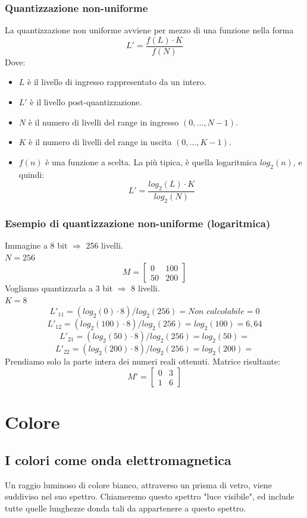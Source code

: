\documentclass{report}
\begin{document}
	\subsection{Quantizzazione non-uniforme}
	La quantizzazione non uniforme avviene per mezzo di una funzione nella forma
	$$
	L' = \frac{f(L) \cdot K}{f(N)}
	$$
	Dove:
	\begin{itemize}
		\item $L$ è il livello di ingresso rappresentato da un intero.
		\item $L'$ è il livello post-quantizzazione.
		\item $N$ è il numero di livelli del range in ingresso $(0, ..., N-1)$.
		\item $K$ è il numero di livelli del range in uscita $(0, ..., K-1)$.
		\item $f(n)$ è una funzione a scelta. La più tipica, è quella logaritmica $log_2(n)$, e quindi:
		      $$
		      L' = \frac{log_2(L) \cdot K}{log_2(N)}
		      $$
	\end{itemize}
	
	
	
	\subsection{Esempio di quantizzazione non-uniforme (logaritmica)}
	Immagine a 8 bit $\Rightarrow$ 256 livelli.\\
	$N = 256$
	$$
	M = 
	\begin{bmatrix}
		0  & 100 \\
		50 & 200 
	\end{bmatrix}
	$$
	Vogliamo quantizzarla a 3 bit $\Rightarrow$ 8 livelli.\\
	$K = 8$
	$$
	L'_{11} = (log_2(0) \cdot 8)/log_2(256) = \textit{Non calcolabile} = 0
	$$
	$$
	L'_{12} = (log_2(100) \cdot 8)/log_2(256) = log_2(100) = 6,64
	$$
	$$
	L'_{21} = (log_2(50) \cdot 8)/log_2(256) = log_2(50) =
	$$
	$$
	L'_{22} = (log_2(200) \cdot 8)/log_2(256) = log_2(200) =
	$$
	Prendiamo solo la parte intera dei numeri reali ottenuti. Matrice risultante:
	$$
	M' = 
	\begin{bmatrix}
		0 & 3 \\
		1 & 6 
	\end{bmatrix}
	$$
	\newpage
	\chapter{Colore}
	\section{I colori come onda elettromagnetica}
	Un raggio luminoso di colore bianco, attraverso un prisma di vetro, viene suddiviso nel suo spettro. Chiameremo questo spettro "luce visibile", ed include tutte quelle lunghezze donda tali da appartenere a questo spettro.
\end{document}
